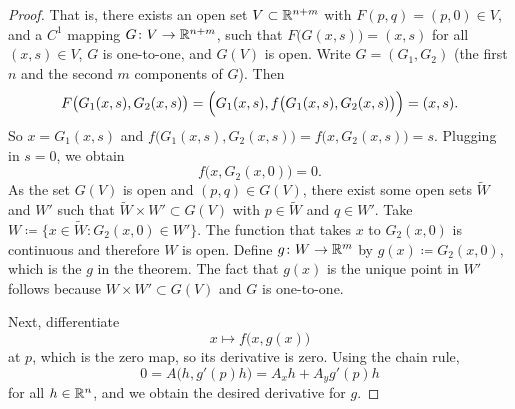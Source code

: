\begin{proof}
That is, there exists an open set $V \subset {\mathbb{R}}^{n+m}$ with
$F(p,q) = (p,0) \in V$,
and a  $C^1$
mapping $G \colon V \to {\mathbb{R}}^{n+m}$, such that $F\bigl(G(x,s)\bigr) = (x,s)$ for
all $(x,s) \in V$, $G$ is one-to-one, and $G(V)$ is open. %
Write $G = (G_1,G_2)$ (the first $n$ and the second $m$ components of $G$).
Then
\begin{equation*}
F\bigl(G_1(x,s),G_2(x,s)\bigr) = \Bigl(G_1(x,s),f\bigl(G_1(x,s),G_2(x,s) \bigr)\Bigr)
= (x,s) .
\end{equation*}
So $x = G_1(x,s)$ and $f\bigl(G_1(x,s),G_2(x,s)\bigr) = f\bigl(x,G_2(x,s)\bigr) = s$.
Plugging in $s=0$, we obtain
\begin{equation*}
f\bigl(x,G_2(x,0)\bigr) = 0 .
\end{equation*}
As the set $G(V)$ is open and $(p,q) \in G(V)$,
there exist some open sets
$\widetilde{W}$ and $W'$ such that $\widetilde{W} \times W' \subset G(V)$ with $p
\in \widetilde{W}$ and
$q \in W'$.
Take $W \coloneqq \bigl\{ x \in \widetilde{W} : G_2(x,0) \in W' \bigr\}$.
The function that takes $x$ to $G_2(x,0)$ is continuous and therefore $W$
is open.
Define
$g \colon W \to {\mathbb{R}}^m$ by $g(x) \coloneqq G_2(x,0)$, which is the $g$ in the theorem.
The fact that $g(x)$ is the unique point in $W'$ follows because $W \times
W' \subset G(V)$ and $G$ is one-to-one.

Next, differentiate
\begin{equation*}
x\mapsto f\bigl(x,g(x)\bigr)
\end{equation*}
at $p$,
which is the zero map, so its derivative is zero.
Using the chain rule,
\begin{equation*}
0 = A\bigl(h,g'(p)h\bigr) = A_xh + A_yg'(p)h
\end{equation*}
for all $h \in {\mathbb{R}}^{n}$,
and we obtain the desired derivative for $g$.
\end{proof}

